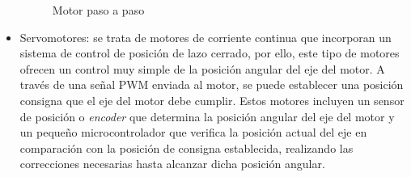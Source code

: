 \begin{itemize}
    \begin{figure}[H]
    \centering
    \caption{Motor paso a paso} \label{fig:lego}
    \end{figure}
  
    \item Servomotores: se trata de motores de corriente continua que incorporan un sistema de control de posición de lazo cerrado, por ello, este tipo de motores ofrecen un control muy simple de la posición angular del eje del motor. A través de una señal PWM enviada al motor, se puede establecer una posición consigna que el eje del motor debe cumplir. Estos motores incluyen un sensor de posición o \textit{encoder} que determina la posición angular del eje del motor y un pequeño microcontrolador que verifica la posición actual del eje en comparación con la posición de consigna establecida, realizando las correcciones necesarias hasta alcanzar dicha posición angular.
    

\end{itemize}
